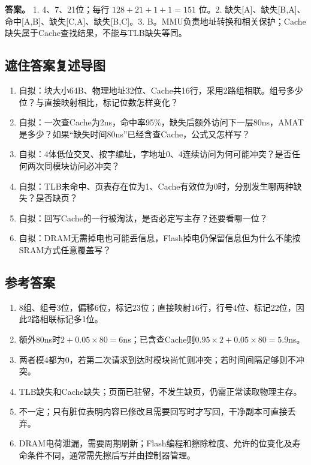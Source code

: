 \textbf{答案。} 1. 4、7、21位；每行 \(128+21+1+1=151\) 位。2. 缺失{[}A{]}、缺失{[}B,A{]}、命中{[}A,B{]}、缺失{[}C,A{]}、缺失{[}B,C{]}。3. B。MMU负责地址转换和相关保护；Cache缺失属于Cache查找结果，不能与TLB缺失等同。

\subsection{遮住答案复述导图}\label{CO03-recall-new}

\begin{recallcard}[主动回忆·自拟]

\begin{enumerate}
\def\labelenumi{\arabic{enumi}.}
\setcounter{enumi}{3}
\tightlist
\item
  自拟：块大小64B、物理地址32位、Cache共16行，采用2路组相联。组号多少位？与直接映射相比，标记位数怎样变化？
\item
  自拟：一次查Cache为2ns，命中率95\%，缺失后额外访问下一层80ns，AMAT是多少？如果``缺失时间80ns''已经含查Cache，公式又怎样写？
\item
  自拟：4体低位交叉、按字编址，字地址0、4连续访问为何可能冲突？是否任何两次同模块访问必冲突？
\item
  自拟：TLB未命中、页表存在位为1、Cache有效位为0时，分别发生哪两种缺失？是否缺页？
\item
  自拟：回写Cache的一行被淘汰，是否必定写主存？还要看哪一位？
\item
  自拟：DRAM无需掉电也可能丢信息，Flash掉电仍保留信息但为什么不能按SRAM方式任意覆盖写？
\end{enumerate}

\end{recallcard}

\subsection{参考答案}\label{CO03-answers}

{\begin{recallcard}[自拟题核对答案]

\begin{enumerate}
\def\labelenumi{\arabic{enumi}.}
\setcounter{enumi}{3}
\tightlist
\item
  8组、组号3位，偏移6位，标记23位；直接映射16行，行号4位、标记22位，因此2路相联标记多1位。
\item
  额外80ns时\(2+0.05\times80=6\)ns；已含查Cache则\(0.95\times2+0.05\times80=5.9\)ns。
\item
  两者模4都为0，若第二次请求到达时模块尚忙则冲突；若时间间隔足够则不冲突。
\item
  TLB缺失和Cache缺失；页面已驻留，不发生缺页，仍需正常读取物理主存。
\item
  不一定；只有脏位表明内容已修改且需要回写时才写回，干净副本可直接丢弃。
\item
  DRAM电荷泄漏，需要周期刷新；Flash编程和擦除粒度、允许的位变化及寿命条件不同，通常需先擦后写并由控制器管理。
\end{enumerate}

\end{recallcard}}
